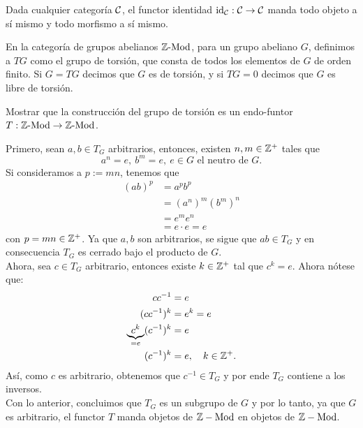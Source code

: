     \begin{exa}
    \item Dada cualquier categoría $\cal C$, el functor identidad
        $\id_{\cal C}:\cal C\to\cal C$ manda todo objeto a sí mismo y todo
        morfismo a sí mismo.
    \item En la categoría de grupos abelianos $\Z\ds\Mod$, para
    un grupo abeliano $G$,     definimos a $TG$ como el grupo de
    torsión, que consta de todos los elementos de $G$ de orden
    finito. Si $G=TG$ decimos que $G$ es de torsión, y si $TG=0$
    decimos que $G$ es libre de torsión.
    \end{exa}
    
    \begin{exe}%
        Mostrar que la construcción del grupo de torsión
        es un endo-funtor $T:\Z\ds\Mod\to\Z\ds\Mod$.
        \begin{sol}
    Primero, sean $a,b\in T_G$ arbitrarios, entonces, existen $n,m\in\Z^+$ tales que
    \begin{equation*}
        a^n=e,\ b^m=e,\ e\in G \text{ el neutro de } G.
    \end{equation*}
    Si consideramos a $p:=mn$, tenemos que 
    \begin{align*}
        (ab)^p & = a^p b^p \\
               & = (a^n)^m (b^m)^n \\
               & = e^m e^n \\
               & = e \cdot e = e
    \end{align*}
    con $p=mn\in\Z^+$. Ya que $a,b$ son arbitrarios, se sigue que $ab\in T_G$ y en consecuencia $T_G$ es cerrado bajo el producto de $G$.\\
    Ahora, sea $c\in T_G$ arbitrario, entonces existe $k\in\Z^+$ tal que $c^k=e$. Ahora nótese que:
    \begin{align*}
        cc^{-1} & = e \\
        (cc^{-1})^k & = e^k = e \\
        \underbrace{c^k}_{=e}(c^{-1})^k & = e \\
        (c^{-1})^k & = e,\quad k\in\Z^+.
    \end{align*}
    Así, como $c$ es arbitrario, obtenemos que $c^{-1}\in T_G$ y por ende $T_G$ contiene a los inversos.\\
    Con lo anterior, concluimos que $T_G$ es un subgrupo de $G$ y por lo tanto, ya que $G$ es arbitrario, el functor $T$ manda objetos de $\Z-\mathrm{Mod}$ en objetos de $\Z-\mathrm{Mod}$.

\end{sol}
\end{exe}
